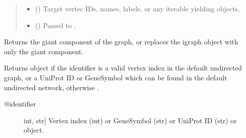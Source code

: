 \documentclass[letterpaper,10pt,english]{sphinxmanual}
\begin{document}
\begin{fulllineitems}
\begin{fulllineitems}
\begin{quote}
\begin{description}
\begin{itemize}
\item {} 
 () \textendash{} Target vertec IDs, names, labels, or any iterable yielding
 objects.

\item {} 
 () \textendash{} Passed to .

\end{itemize}

\end{description}\end{quote}

\end{fulllineitems}


\begin{fulllineitems}
\label{\detokenize{main:pypath.main.PyPath.get_giant}}
Returns the giant component of the graph, or
replaces the igraph object with only the giant
component.

\end{fulllineitems}


\begin{fulllineitems}
\label{\detokenize{main:pypath.main.PyPath.get_node}}
Returns  object if the identifier
is a valid vertex index in the default undirected graph,
or a UniProt ID or GeneSymbol which can be found in the
default undirected network, otherwise .
\begin{description}
\item[{@identifier}] \leavevmode{[}int, str{]}
Vertex index (int) or GeneSymbol (str) or UniProt ID (str) or
 object.

\end{description}

\end{fulllineitems}



\end{fulllineitems}
\end{document}
